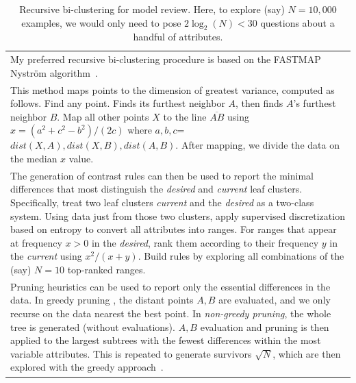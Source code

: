 \documentclass[sigconf,screen]{acmart}
\begin{document}
\begin{table}[!t]
\caption{Recursive bi-clustering for  model review. Here,
to explore (say)  $N=10,000$ examples, we would only need to pose  \mbox{$2\log_2(N)<30$} questions about
a handful of attributes.}\label{stealth}
\begin{tabular}{|p{.98\linewidth}|}\hline
\rowcolor{blue!10}
My preferred 
recursive bi-clustering procedure is  based on the FASTMAP Nystr{\"o}m algorithm~\cite{faloutsos1995fastmap,platt2005fastmap,papakroni2013data}. \\
This method maps points to the dimension
of greatest variance, computed as follows. Find any point.
Finds its furthest neighbor $A$, then finds $A$'s furthest neighbor
$B$. Map all other   points $X$   to the line  $\overline{AB}$ using 
$x=(a^2+c^2-b^2)/(2c)$ where $a,b,c$=${\mathit dist}(X,A), {\mathit dist}(X,B), {\mathit dist}(A,B)$. 
After mapping, we divide the data on the median $x$ value.
 \\
 \rowcolor{blue!10} The generation of contrast rules can then be used to report the minimal differences that
most distinguish the  {\em desired} and {\em current} leaf clusters. Specifically,
treat two leaf clusters {\em current} and the {\em desired} as a two-class
system. Using data just from those two clusters,
apply supervised discretization based on entropy to convert all attributes
into ranges. For ranges that appear
at frequency $x>0$ in the {\em desired}, rank them according to their frequency
$y$ in the {\em current}   using $x^2/(x+y)$.
  Build rules by exploring
all combinations of the (say) $N=10$ top-ranked ranges. 
\\
Pruning heuristics can be used to report only the essential differences in the data.
In greedy pruning {\em},
the distant points $A,B$ are evaluated, and we only recurse on the data nearest
the best point. In 
{\em non-greedy pruning}, the whole tree is generated (without
evaluations). $A,B$ evaluation and pruning is
then applied to the largest subtrees with the fewest differences within the most
variable attributes. This is repeated to generate survivors $\sqrt{N}$,
which are then explored with the greedy approach~\cite{lustosa2023optimizing}.\\\hline
\end{tabular}

\end{table}
\end{document}
